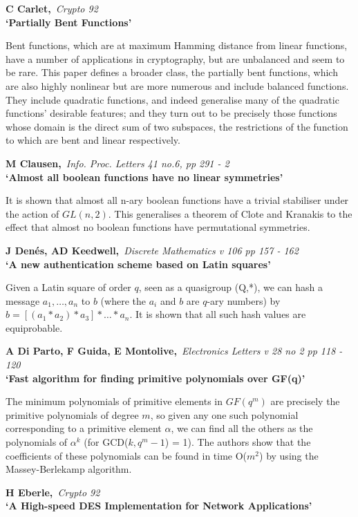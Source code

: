 {\bf \noindent C Carlet,}{\em ~Crypto 92\\}
{\bf `Partially Bent Functions'}

Bent functions, which are at maximum Hamming distance from linear functions,
have a number of applications in cryptography, but are unbalanced and seem to 
be rare. This paper defines a broader class, the partially bent functions,
which are also highly nonlinear but are more numerous and include balanced 
functions. They include quadratic functions, and indeed generalise many of the 
quadratic functions' desirable features; and they turn out to be precisely 
those functions whose domain is the direct sum of two subspaces, the 
restrictions of the function to which are bent and linear respectively.

{\bf \noindent M Clausen,}{\em ~Info. Proc. Letters 41 no.6, pp 291 - 2\\}
{\bf `Almost all boolean functions have no linear symmetries'}

It is shown that almost all n-ary boolean functions have a trivial
stabiliser under the action of $GL(n,2)$. This generalises a theorem of
Clote and Kranakis to the effect that almost no boolean functions have
permutational symmetries.

{\bf \noindent J Den\'{e}s, AD Keedwell,}{\em ~Discrete Mathematics v 106
pp 157 - 162\\}
{\bf `A new authentication scheme based on Latin squares'}

Given a Latin square of order $q$, seen as a quasigroup (Q,*), we can hash a
message $a_1, \ldots, a_n$ to $b$ (where the $a_i$ and $b$ are $q$-ary numbers)
by $b = {[(a_1*a_2)*a_3]*\ldots }*a_n$. It is shown that all such hash values
are equiprobable.
 
{\bf \noindent A Di Parto, F Guida, E Montolive,}{\em ~Electronics Letters 
v 28 no 2 pp 118 - 120\\}
{\bf `Fast algorithm for finding primitive polynomials over GF(q)'}

The minimum polynomials of primitive elements in $GF(q^m)$ are precisely the
primitive polynomials of degree $m$, so given any one such polynomial 
corresponding to a primitive element $\alpha$, we can find all the others as 
the polynomials of $\alpha ^k$ (for GCD($k, q^m-1$) = 1). The authors show
that the coefficients of these polynomials can be found in time O($m^2$) by
using the Massey-Berlekamp algorithm.

{\bf \noindent H Eberle,}{\em ~Crypto 92\\}
{\bf `A High-speed DES Implementation for Network Applications'}

